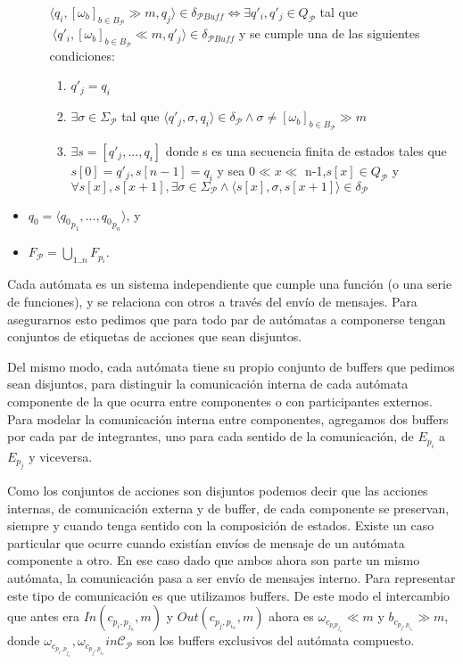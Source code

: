 \begin{definition}[Composición]
\begin{itemize}
\begin{enumerate}
$\langle q_i, [\omega_\mathit{b}]_{b \in B_\mathcal{P}} \gg m, q_j \rangle \in \delta_\mathit{\mathcal{P}Buff} \iff \exists q'_i, q'_j \in Q_\mathit{\mathcal{P}}$ tal que $\ \langle q'_i, [\omega_\mathit{b}]_{b \in B_\mathcal{P}} \ll m, q'_j \rangle \in \delta_\mathit{\mathcal{P}Buff}$ y se cumple una de las siguientes condiciones:
\begin{enumerate}
\item $q'_j = q_i$ 
\item $\exists \sigma \in \Sigma_\mathit{\mathcal{P}}$ tal que $\langle q'_j, \sigma, q_i \rangle \in \delta_\mathit{\mathcal{P}} \land \sigma \neq [\omega_\mathit{b}]_{b \in B_\mathcal{P}} \gg m $
\item $\exists s=[q'_j,...,q_i] $ donde s es una secuencia finita de estados tales que $s[0]= q'_j, s[n-1]=q_i$ y sea $ 0 \ll x \ll$ n-1,$s[x] \in Q_\mathit{\mathcal{P}}$ y $\forall s[x], s[x+1], \exists \sigma \in \Sigma_\mathit{\mathcal{P}} \land \langle s[x], \sigma, s[x+1] \rangle \in \delta_\mathit{\mathcal{P}} $  
\end{enumerate} 
\end{enumerate}
\item $q_0 = \langle {q_0}_{p_1}, \ldots, {q_0}_{p_n} \rangle$, y
\item $F_{\mathcal{P}} = \bigcup_{1..n} F_{p_i}$.
\end{itemize}
\end{definition}


Cada autómata es un sistema independiente que cumple una función (o una serie de funciones), y se relaciona con otros a través del envío de mensajes. Para asegurarnos esto pedimos que para todo par de autómatas a componerse tengan conjuntos de etiquetas de acciones que sean disjuntos. 

Del mismo modo, cada autómata tiene su propio conjunto de buffers que pedimos sean disjuntos, para distinguir la comunicación interna de cada autómata componente de la que ocurra entre componentes o con participantes externos. Para modelar la comunicación interna entre componentes, agregamos dos buffers por cada par de integrantes, uno para cada sentido de la comunicación, de $E_{p_i}$ a $E_{p_j}$ y viceversa.

Como los conjuntos de acciones son disjuntos podemos decir que las acciones internas, de comunicación externa y de buffer, de cada componente se preservan, siempre y cuando tenga sentido con la composición de estados. Existe un caso particular que ocurre cuando existían envíos de mensaje de un autómata componente a otro. En ese caso dado que ambos ahora son parte un mismo autómata, la comunicación pasa a ser envío de mensajes interno. Para representar este tipo de comunicación es que utilizamos buffers. De este modo el intercambio que antes era $\mathit{In} (c_{p_i, p_{j_n}},m)$ y $\mathit{Out}(c_{p_j, p_{i_n}},m)$ ahora es $\omega_{c_{p_i p_{j_n}}}  \ll m$ y $b_{c_{p_j, p_{i_n}}}  \gg  m$, donde $ \omega_{c_{p_i, p_{j_n}}}, \omega_{c_{p_j, p_{i_n}}} in \mathcal{C}_{\mathcal{P}} $ son los buffers exclusivos del autómata compuesto. 

